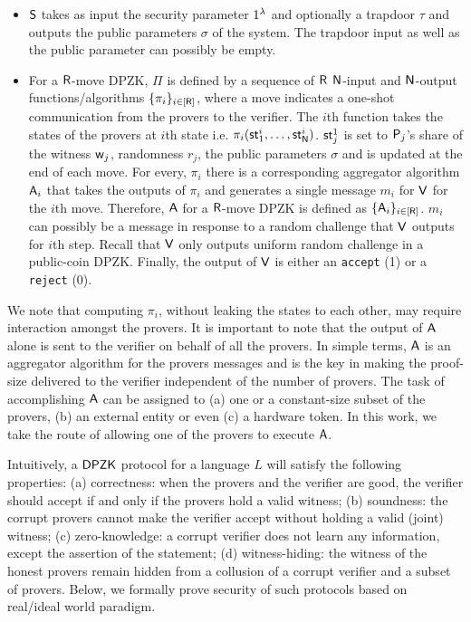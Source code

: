 \begin{itemize}
\item $\mathsf{S}$ takes as input the security parameter $1^{\lambda}$ and optionally a trapdoor $\tau$ and outputs the public parameters $\sigma$ of the system. The trapdoor input as well as the public parameter can possibly be empty.
\item For a $\mathsf{R}$-move DPZK, $\Pi$ is defined by a sequence of $\mathsf{R}$ $\mathsf{N}$-input and $\mathsf{N}$-output functions/algorithms   $\{\pi_i\}_{i \in [\mathsf{R}]}$, where a move indicates a one-shot communication from the provers to the verifier.  The $i$th function takes the states of the provers at $i$th state i.e. $\pi_i(\mathsf{st}^i_1, \ldots, \mathsf{st}^i_{\mathsf{N}})$. $\mathsf{st}^1_j$ is set to  $\mathsf{P}_j$'s share of the witness $\mathsf{w}_j$, randomness $r_j$, the public parameters $\sigma$ and is updated at the end of each move.  For every, $\pi_i$ there is a corresponding aggregator algorithm $\mathsf{A}_i$ that takes the outputs of $\pi_i$ and generates a single message  $m_i$ for $\mathsf{V}$ for the $i$th move. Therefore, $\mathsf{A}$ for a $\mathsf{R}$-move DPZK is defined as $\{\mathsf{A}_i\}_{i \in [\mathsf{R}]}$.  $m_i$ can possibly be  a message in response to a random challenge that $\mathsf{V}$ outputs for $i$th step. Recall that $\mathsf{V}$ only outputs uniform random challenge in a public-coin DPZK. Finally, the output of $\mathsf{V}$ is either an {\tt accept} (1) or a {\tt reject} (0).%
\end{itemize}
We note that computing $\pi_i$, without leaking the states to each other, may require interaction amongst the provers. It is important to note that the output of $\mathsf{A}$ alone is sent to the verifier on behalf of all the provers. In simple terms,  $\mathsf{A}$ is an aggregator algorithm for the provers messages and is the key in making the proof-size delivered to the verifier independent of the number of provers.  The task of accomplishing $\mathsf{A}$ can be assigned to (a) one or a constant-size subset of the provers, (b) an external entity or even (c) a hardware token.  In this work, we take the route of allowing one of the provers to execute $\mathsf{A}$.

Intuitively, a $\mathsf{DPZK}$ protocol for a language $L$ will satisfy the following properties: (a)  correctness:  when the provers and the verifier are good, the verifier should accept if and only if the provers hold a valid witness; (b) soundness:  the corrupt provers cannot make the verifier accept without holding a valid (joint) witness; (c) zero-knowledge: a corrupt verifier does not learn any information, except  the assertion of the statement; (d)  witness-hiding: the witness of the honest provers remain hidden from a collusion of a corrupt verifier and a subset of provers. Below, we formally prove security of such protocols based on real/ideal world paradigm. 

